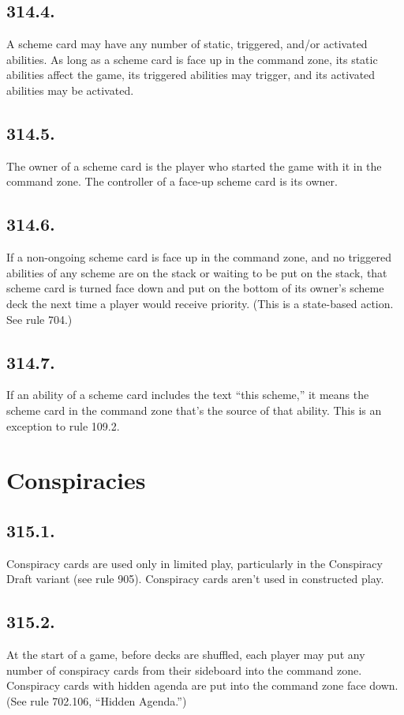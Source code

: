 \subsection*{314.4.}
A scheme card may have any number of static, triggered, and/or activated abilities. As long as a scheme card is face up in the command zone, its static abilities affect the game, its triggered abilities may trigger, and its activated abilities may be activated.

\subsection*{314.5.}
The owner of a scheme card is the player who started the game with it in the command zone. The controller of a face-up scheme card is its owner.

\subsection*{314.6.}
If a non-ongoing scheme card is face up in the command zone, and no triggered abilities of any scheme are on the stack or waiting to be put on the stack, that scheme card is turned face down and put on the bottom of its owner’s scheme deck the next time a player would receive priority. (This is a state-based action. See rule 704.)

\subsection*{314.7.}
If an ability of a scheme card includes the text “this scheme,” it means the scheme card in the command zone that’s the source of that ability. This is an exception to rule 109.2.

\section{Conspiracies}
\subsection*{315.1.}
Conspiracy cards are used only in limited play, particularly in the Conspiracy Draft variant (see rule 905). Conspiracy cards aren’t used in constructed play.

\subsection*{315.2.}
At the start of a game, before decks are shuffled, each player may put any number of conspiracy cards from their sideboard into the command zone. Conspiracy cards with hidden agenda are put into the command zone face down. (See rule 702.106, “Hidden Agenda.”)

